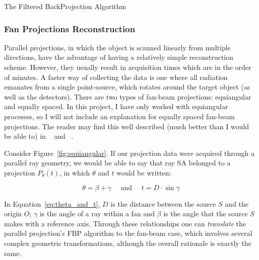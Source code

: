 \begin{algorithm}
    \caption{The Filtered BackProjection Algorithm}
    \label{alg:fbp}
    \begin{algorithmic}
    \ENDFOR
    \end{algorithmic}
\end{algorithm}

\subsubsection{Fan Projections Reconstruction}%
\label{ssub:fan_projections_reconstruction}

Parallel projections, in which the object is scanned linearly from
multiple directions, have the advantage of having a relatively simple
reconstruction scheme. However, they usually result in acquisition times
which are in the order of minutes. A faster way of collecting the data
is one where all radiation emanates from a single point-source, which
rotates around the target object (as well as the detectors). There are
two types of fan-beam projections: equiangular and equally spaced. In
this project, I have only worked with equiangular processes, so I will
not include an explanation for equally spaced fan-beam projections. The
reader may find this well described (much better than I would be able
to) in ~\cite{Kak2001} and ~\cite{Herman1973}.

Consider Figure~\ref{fig:equiangular}. If our projection data were
acquired through a parallel ray geometry, we would be able to say that
ray SA belonged to a projection $P_{\theta}(t)$, in which $\theta$ and
$t$ would be written:

\begin{equation}
    \label{eq:theta_and_t}
    \theta = \beta + \gamma \quad \text{ and } \quad t = D \cdot \sin \gamma
\end{equation}

In Equation~\ref{eq:theta_and_t}, $D$ is the distance between the source
$S$ and the origin $O$; $\gamma$ is the angle of a ray within a fan and
$\beta$ is the angle that the source $S$ makes with a reference axis.
Through these relationships one can \emph{translate} the parallel
projection's FBP algorithm to the fan-beam case, which involves several
complex geometric transformations, although the overall rationale is
exactly the same.

